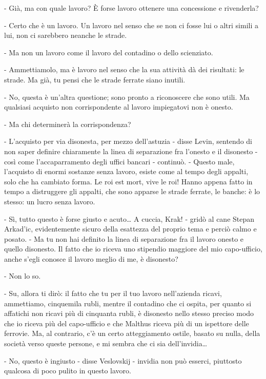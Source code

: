 - Già, ma con quale lavoro? È forse lavoro ottenere una concessione e rivenderla? 

- Certo che è un lavoro. Un lavoro nel senso che se non ci fosse lui o altri simili a lui, non ci sarebbero neanche le strade. 

- Ma non un lavoro come il lavoro del contadino o dello scienziato. 

- Ammettiamolo, ma è lavoro nel senso che la sua attività dà dei risultati: le strade. Ma già, tu pensi che le strade ferrate siano inutili. 

- No, questa è un'altra questione; sono pronto a riconoscere che sono utili. Ma qualsiasi acquisto non corrispondente al lavoro impiegatovi non è onesto. 

- Ma chi determinerà la corrispondenza? 

- L'acquisto per via disonesta, per mezzo dell'astuzia - disse Levin, sentendo di non saper definire chiaramente la linea di separazione fra l'onesto e il disonesto - così come l'accaparramento degli uffici bancari - continuò. - Questo male, l'acquisto di enormi sostanze senza lavoro, esiste come al tempo degli appalti, solo che ha cambiato forma. Le roi est mort, vive le roi! Hanno appena fatto in tempo a distruggere gli appalti, che sono apparse le strade ferrate, le banche: è lo stesso: un lucro senza lavoro. 

- Sì, tutto questo è forse giusto e acuto\ldots{} A cuccia, Krak! - gridò al cane Stepan Arkad'ic, evidentemente sicuro della esattezza del proprio tema e perciò calmo e posato. - Ma tu non hai definito la linea di separazione fra il lavoro onesto e quello disonesto. Il fatto che io riceva uno stipendio maggiore del mio capo-ufficio, anche s'egli conosce il lavoro meglio di me, è disonesto? 

- Non lo so. 

- Su, allora ti dirò: il fatto che tu per il tuo lavoro nell'azienda ricavi, ammettiamo, cinquemila rubli, mentre il contadino che ci ospita, per quanto si affatichi non ricavi più di cinquanta rubli, è disonesto nello stesso preciso modo che io riceva più del capo-ufficio e che Malthus riceva più di un ispettore delle ferrovie. Ma, al contrario, c'è un certo atteggiamento ostile, basato su nulla, della società verso queste persone, e mi sembra che ci sia dell'invidia\ldots{} 

- No, questo è ingiusto - disse Veslovskij - invidia non può esserci, piuttosto qualcosa di poco pulito in questo lavoro. 

